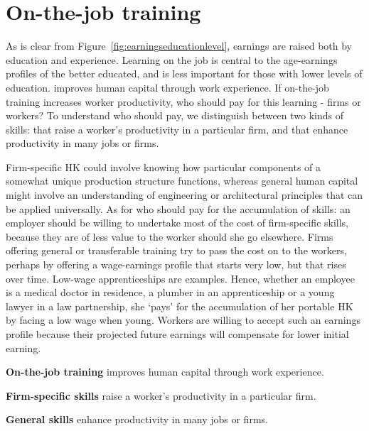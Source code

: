 \section{On-the-job training}\label{sec:ch13sec3}

As is clear from Figure~\ref{fig:earningseducationlevel}, earnings are raised both by education and experience. Learning on the job is central to the age-earnings profiles of the better educated, and is less important for those with lower levels of education.  improves human capital through work experience. If on-the-job training increases worker productivity, who should pay for this learning - firms or workers? To understand who should pay, we distinguish between two kinds of skills:  that raise a worker's productivity in a particular firm, and  that enhance productivity in many jobs or firms.

Firm-specific HK could involve knowing how particular components of a somewhat unique production structure functions, whereas general human capital might involve an understanding of engineering or architectural principles that can be applied universally. As for who should pay for the accumulation of skills: an employer should be willing to undertake most of the cost of firm-specific skills, because they are of less value to the worker should she go elsewhere. Firms offering general or transferable training try to pass the cost on to the workers, perhaps by offering a wage-earnings profile that starts very low, but that rises over time. Low-wage apprenticeships are examples. Hence, whether an employee is a medical doctor in residence, a plumber in an apprenticeship or a young lawyer in a law partnership, she `pays' for the accumulation of her portable HK by facing a low wage when young. Workers are willing to accept such an earnings profile because their projected future earnings will compensate for lower initial earning.

\begin{DefBox}
\textbf{On-the-job training} improves human capital through work experience.

\textbf{Firm-specific skills} raise a worker's productivity in a particular firm.

\textbf{General skills} enhance productivity in many jobs or firms.
\end{DefBox}